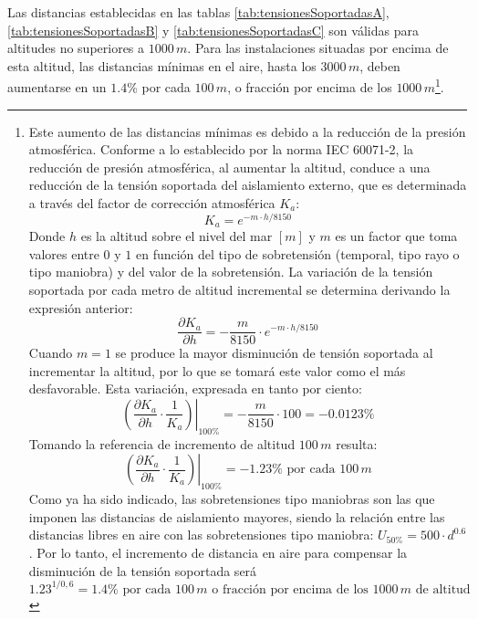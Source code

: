             Las distancias establecidas en las tablas \ref{tab:tensionesSoportadasA}, \ref{tab:tensionesSoportadasB} y \ref{tab:tensionesSoportadasC} son válidas para altitudes no superiores a $1000\,\textit{m}$. Para las instalaciones situadas por encima de esta altitud, las distancias mínimas en el aire, hasta los $3000\,\textit{m}$, deben aumentarse en un $1.4\!$\% por cada $100\,\textit{m}$, o fracción por encima de los $1000\,\textit{m}$\footnote{Este aumento de las distancias mínimas es debido a la reducción de la presión atmosférica. Conforme a lo establecido por la norma IEC 60071-2, la reducción de presión atmosférica, al aumentar la altitud, conduce a una reducción de la tensión soportada del aislamiento externo, que es determinada a través del factor de corrección atmosférica $K_\textit{a}$: $$K_\textit{a} = e^{-m\cdot h/8150}$$ Donde $h$ es la altitud sobre el nivel del mar $[\textit{m}]$ y $m$ es un factor que toma valores entre $0$ y $1$ en función del tipo de sobretensión (temporal, tipo rayo o tipo maniobra) y del valor de la sobretensión. La variación de la tensión soportada por cada metro de altitud incremental se determina derivando la expresión anterior: $$\dfrac{\partial K_\textit{a}}{\partial h} = -\dfrac{m}{8150}\cdot e^{-m\cdot h/8150}$$ Cuando $m=1$ se produce la mayor disminución de tensión soportada al incrementar la altitud, por lo que se tomará este valor como el más desfavorable. Esta variación, expresada en tanto por ciento: $$\left.\left(\dfrac{\partial K_\textit{a}}{\partial h}\cdot\dfrac{1}{K_\textit{a}}\right)\right|_{100\!\text{\%}} = -\dfrac{m}{8150}\cdot 100 = -0.0123\!\text{\%}$$ Tomando la referencia de incremento de altitud $100\,\textit{m}$ resulta: $$\left.\left(\dfrac{\partial K_\textit{a}}{\partial h}\cdot\dfrac{1}{K_\textit{a}}\right)\right|_{100\!\text{\%}} = -1.23\!\text{\%}\text{ por cada }100\,\textit{m}$$ Como ya ha sido indicado, las sobretensiones tipo maniobras son las que imponen las distancias de aislamiento mayores, siendo la relación entre las distancias libres en aire con las sobretensiones tipo maniobra: $U_{50\!\text{\%}} = 500\cdot d^{0.6}$. Por lo tanto, el incremento de distancia en aire para compensar la disminución de la tensión soportada será $$1.23^{1/0,6}=1.4\!\text{\%}\text{ por cada }100\,\textit{m}\text{ o fracción por encima de los }1000\,\textit{m}\text{ de altitud}$$\!}.